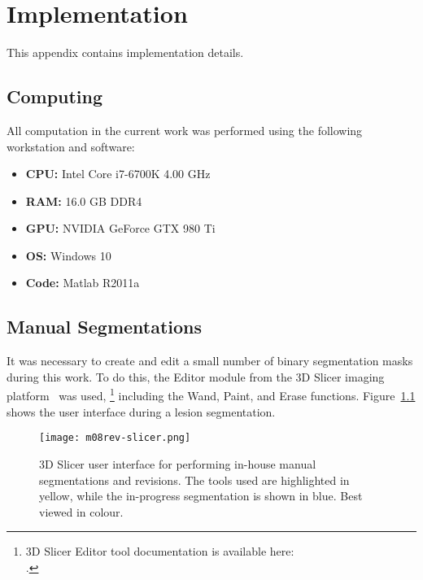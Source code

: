 \chapter{Implementation}
This appendix contains implementation details.
\section{Computing}
All computation in the current work was performed using the following workstation and software:
\begin{itemize}[topsep=0pt,itemsep=-6pt]
  \item \textbf{CPU:} Intel Core i7-6700K 4.00 GHz
  \item \textbf{RAM:} 16.0 GB DDR4
  \item \textbf{GPU:} NVIDIA GeForce GTX 980 Ti
  \item \textbf{OS:} Windows 10
  \item \textbf{Code:} Matlab R2011a
\end{itemize}
\section{Manual Segmentations}
It was necessary to create and edit a small number of binary segmentation masks during this work.
To do this, the Editor module from the 3D Slicer imaging platform~\cite{Fedorov2012} was used,%
\footnote{3D Slicer Editor tool documentation is available here:\\
  .}
including the Wand, Paint, and Erase functions.
Figure~\ref{fig:m08-rev-slicer} shows the user interface during a lesion segmentation.
\begin{figure}[ht]
  \centering
  \texttt{[image: m08rev-slicer.png]}
  \caption{3D Slicer user interface for performing in-house manual segmentations and revisions.
    The tools used are highlighted in yellow, while the in-progress segmentation is shown in blue.
    Best viewed in colour.}%
  \label{fig:m08-rev-slicer}
\end{figure}

